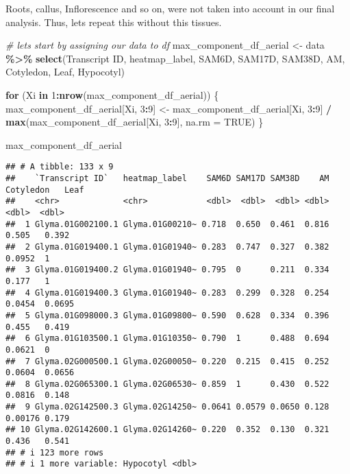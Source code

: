 \documentclass[
]{article}
\newenvironment{Shaded}{\begin{snugshade}}{\end{snugshade}}
\newcommand{\AttributeTok}[1]{\textcolor[rgb]{0.13,0.29,0.53}{#1}}
\newcommand{\CommentTok}[1]{\textcolor[rgb]{0.56,0.35,0.01}{\textit{#1}}}
\newcommand{\ConstantTok}[1]{\textcolor[rgb]{0.56,0.35,0.01}{#1}}
\newcommand{\ControlFlowTok}[1]{\textcolor[rgb]{0.13,0.29,0.53}{\textbf{#1}}}
\newcommand{\DecValTok}[1]{\textcolor[rgb]{0.00,0.00,0.81}{#1}}
\newcommand{\FunctionTok}[1]{\textcolor[rgb]{0.13,0.29,0.53}{\textbf{#1}}}
\newcommand{\NormalTok}[1]{#1}
\newcommand{\OtherTok}[1]{\textcolor[rgb]{0.56,0.35,0.01}{#1}}
\newcommand{\SpecialCharTok}[1]{\textcolor[rgb]{0.81,0.36,0.00}{\textbf{#1}}}
\newcommand{\StringTok}[1]{\textcolor[rgb]{0.31,0.60,0.02}{#1}}
\begin{document}
Roots, callus, Inflorescence and so on, were not taken into account in
our final analysis. Thus, lets repeat this without this tissues.

\begin{Shaded}
\begin{Highlighting}[]
\CommentTok{\# lets start by assigning our data to df}
\NormalTok{max\_component\_df\_aerial }\OtherTok{\textless{}{-}}\NormalTok{ data }\SpecialCharTok{\%\textgreater{}\%} 
  \FunctionTok{select}\NormalTok{(}\StringTok{\textasciigrave{}}\AttributeTok{Transcript ID}\StringTok{\textasciigrave{}}\NormalTok{, heatmap\_label, SAM6D, SAM17D, SAM38D, AM, Cotyledon, Leaf, Hypocotyl)}

\ControlFlowTok{for}\NormalTok{ (Xi }\ControlFlowTok{in} \DecValTok{1}\SpecialCharTok{:}\FunctionTok{nrow}\NormalTok{(max\_component\_df\_aerial)) \{}
\NormalTok{  max\_component\_df\_aerial[Xi, }\DecValTok{3}\SpecialCharTok{:}\DecValTok{9}\NormalTok{] }\OtherTok{\textless{}{-}}\NormalTok{ max\_component\_df\_aerial[Xi, }\DecValTok{3}\SpecialCharTok{:}\DecValTok{9}\NormalTok{] }\SpecialCharTok{/} \FunctionTok{max}\NormalTok{(max\_component\_df\_aerial[Xi, }\DecValTok{3}\SpecialCharTok{:}\DecValTok{9}\NormalTok{], }\AttributeTok{na.rm =} \ConstantTok{TRUE}\NormalTok{)}
\NormalTok{\}}

\NormalTok{max\_component\_df\_aerial}
\end{Highlighting}
\end{Shaded}

\begin{verbatim}
## # A tibble: 133 x 9
##    `Transcript ID`   heatmap_label    SAM6D SAM17D SAM38D    AM Cotyledon   Leaf
##    <chr>             <chr>            <dbl>  <dbl>  <dbl> <dbl>     <dbl>  <dbl>
##  1 Glyma.01G002100.1 Glyma.01G00210~ 0.718  0.650  0.461  0.816   0.505   0.392 
##  2 Glyma.01G019400.1 Glyma.01G01940~ 0.283  0.747  0.327  0.382   0.0952  1     
##  3 Glyma.01G019400.2 Glyma.01G01940~ 0.795  0      0.211  0.334   0.177   1     
##  4 Glyma.01G019400.3 Glyma.01G01940~ 0.283  0.299  0.328  0.254   0.0454  0.0695
##  5 Glyma.01G098000.3 Glyma.01G09800~ 0.590  0.628  0.334  0.396   0.455   0.419 
##  6 Glyma.01G103500.1 Glyma.01G10350~ 0.790  1      0.488  0.694   0.0621  0     
##  7 Glyma.02G000500.1 Glyma.02G00050~ 0.220  0.215  0.415  0.252   0.0604  0.0656
##  8 Glyma.02G065300.1 Glyma.02G06530~ 0.859  1      0.430  0.522   0.0816  0.148 
##  9 Glyma.02G142500.3 Glyma.02G14250~ 0.0641 0.0579 0.0650 0.128   0.00176 0.179 
## 10 Glyma.02G142600.1 Glyma.02G14260~ 0.220  0.352  0.130  0.321   0.436   0.541 
## # i 123 more rows
## # i 1 more variable: Hypocotyl <dbl>
\end{verbatim}
\end{document}
